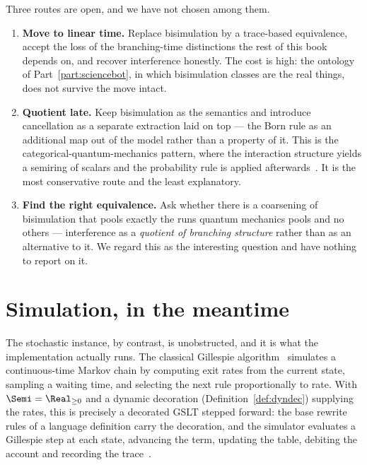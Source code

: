 Three routes are open, and we have not chosen among them.

\begin{enumerate}[itemsep=5pt]
  \item \textbf{Move to linear time.}  Replace bisimulation by a
        trace-based equivalence, accept the loss of the branching-time
        distinctions the rest of this book depends on, and recover
        interference honestly.  The cost is high: the ontology of
        Part~\ref{part:sciencebot}, in which bisimulation classes are the
        real things, does not survive the move intact.

  \item \textbf{Quotient late.}  Keep bisimulation as the semantics and
        introduce cancellation as a separate extraction laid on top ---
        the Born rule as an additional map out of the model rather than a
        property of it.  This is the categorical-quantum-mechanics
        pattern, where the interaction structure yields a semiring of
        scalars and the probability rule is applied
        afterwards~\cite{abramsky}.  It is the most conservative route and
        the least explanatory.

  \item \textbf{Find the right equivalence.}  Ask whether there is a
        coarsening of bisimulation that pools exactly the runs quantum
        mechanics pools and no others --- interference as a \emph{quotient
        of branching structure} rather than as an alternative to it.  We
        regard this as the interesting question and have nothing to report
        on it.
\end{enumerate}

\section{Simulation, in the meantime}

The stochastic instance, by contrast, is unobstructed, and it is what the
implementation actually runs.  The classical Gillespie
algorithm~\cite{gillespie1977exact} simulates a continuous-time Markov
chain by computing exit rates from the current state, sampling a waiting
time, and selecting the next rule proportionally to rate.  With
$\Semi = \Real_{\geq 0}$ and a dynamic decoration
(Definition~\ref{def:dyndec}) supplying the rates, this is precisely a
decorated GSLT stepped forward: the base rewrite rules of a language
definition carry the decoration, and the simulator evaluates a Gillespie
step at each state, advancing the term, updating the table, debiting the
account and recording the trace~\cite{StochSim}.

